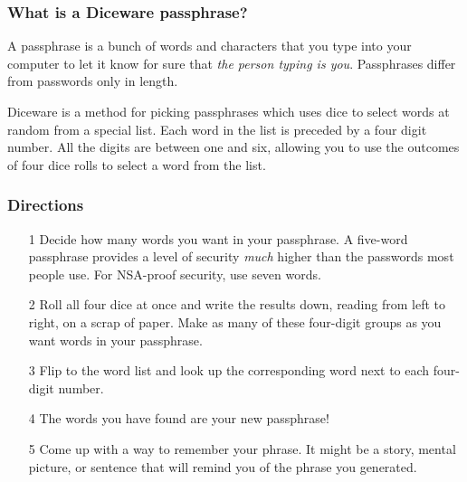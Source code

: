 \label{ch:diceware}

%
%
\setlength{\parindent}{0em}
\setlength{\parskip}{0.25em}

\subsubsection*{What is a Diceware passphrase?}

A passphrase is a bunch of words and characters that you type into your computer to let it know for sure that \textit{the person typing is you}. Passphrases differ from passwords only in length.

Diceware is a method for picking passphrases which uses dice to select words at random from a special list. Each word in the list is preceded by a four digit number. All the digits are between one and six, allowing you to use the outcomes of four dice rolls to select a word from the list.

\subsubsection*{Directions}

\begin{itemize}[leftmargin=*]

\item[1] Decide how many words you want in your passphrase. A five-word passphrase provides a level of security \textit{much} higher than the passwords most people use. For NSA-proof security, use seven words.

\item[2] Roll all four dice at once and write the results down, reading from left to right, on a scrap of paper. Make as many of these four-digit groups as you want words in your passphrase.

\item[3] Flip to the word list and look up the corresponding word next to each four-digit number.

\item[4] The words you have found are your new passphrase!

\item[5] Come up with a way to remember your phrase. It might be a story, mental picture, or sentence that will remind you of the phrase you generated.

\end{itemize}

